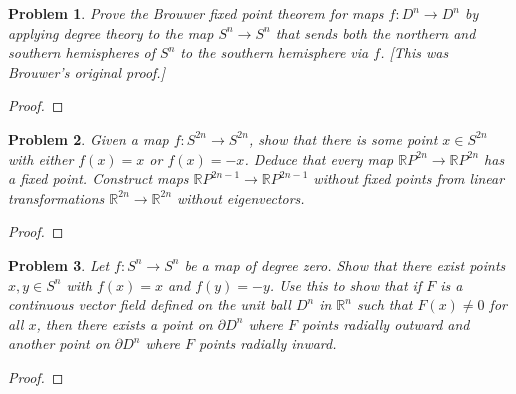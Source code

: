 \documentclass[10pt]{article}
\newcommand{\sk}{\vskip 10mm}
\newcommand{\bb}[1]{\mathbb{#1}}
\theoremstyle{plain}
\newtheorem{problem}{Problem}
\theoremstyle{remark}
\begin{document}
\begin{problem}
  Prove the Brouwer fixed point theorem for maps $f:D^n\rightarrow D^n$
  by applying degree theory to the map $S^n\rightarrow S^n$ that sends
  both the northern and southern hemispheres of $S^n$ to the
  southern hemisphere via $f$. [This was Brouwer's original proof.]
\end{problem}

\begin{proof}
  
\end{proof}

\sk

\begin{problem}
  Given a map $f:S^{2n}\rightarrow S^{2n}$, show that there is some point
  $x\in S^{2n}$ with either $f(x)=x$ or $f(x)=-x$. Deduce that
  every map $\bb{R}P^{2n}\rightarrow \bb{R}P^{2n}$ has a fixed point.
  Construct maps $\bb{R}P^{2n-1}\rightarrow\bb{R}P^{2n-1}$ without fixed points
  from linear transformations $\bb{R}^{2n}\rightarrow\bb{R}^{2n}$ without
  eigenvectors.
\end{problem}

\begin{proof}
  
\end{proof}

\sk

\begin{problem}
  Let $f:S^n\rightarrow S^n$ be a map of degree zero. Show that there exist
  points $x,y\in S^n$ with $f(x)=x$ and $f(y)=-y$. Use this to show
  that if $F$ is a continuous vector field defined on the unit
  ball $D^n$ in $\bb{R}^n$ such that $F(x)\neq 0$ for all $x$, then
  there exists a point on $\partial D^n$ where $F$ points radially outward
  and another point on $\partial D^n$ where $F$ points radially inward.
\end{problem}

\begin{proof}
  
\end{proof}

\end{document}
